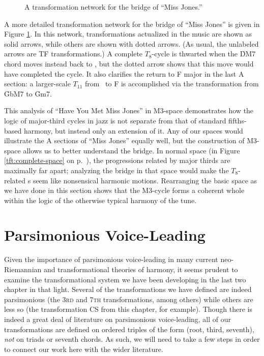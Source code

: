 \begin{figure}[tbp]
  \caption{A transformation network for the bridge of ``Miss Jones.''}
\label{maj3:miss-jones-bridge}
\end{figure}

A more detailed transformation network for the bridge of ``Miss Jones'' is
given in Figure \ref{maj3:miss-jones-bridge}. In this network,
transformations actualized in the music are shown as solid arrows, while
others are shown with dotted arrows. (As usual, the unlabeled arrows are TF
transformations.) A complete $T_8$-cycle is thwarted when the \h{DM7} chord
moves instead back to \Gflat, but the dotted arrow shows that this move would
have completed the cycle. It also clarifies the return to F major in the last
A section: a larger-scale $T_{11}$ from \Gflat\ to F is accomplished via the
\slideS transformation from \h{GbM7} to \h{Gm7}.

This analysis of ``Have You Met Miss Jones'' in M3-space demonstrates how the
logic of major-third cycles in jazz is not separate from that of standard
fifths-based harmony, but instead only an extension of it. Any of our spaces
would illustrate the A sections of ``Miss Jones'' equally well, but the
construction of M3-space allows us to better understand the bridge. In normal
\tf space (in Figure \ref{tft:complete-space} on
p.~\pageref{tft:complete-space}), the \tfo progressions related by major
thirds are maximally far apart; analyzing the bridge in that space would make
the $T_8$-related \tfo{}s seem like nonsensical harmonic motions. Rearranging
the basic space as we have done in this section shows that the M3-cycle forms
a coherent whole within the logic of the otherwise typical harmony of the
tune.

\section{Parsimonious Voice-Leading}
\label{sec:parsimony}

Given the importance of parsimonious voice-leading in many current
neo-Riemannian and transformational theories of harmony, it seems prudent to
examine the transformational system we have been developing in the last two
chapter in that light. Several of the transformations we have defined are
indeed parsimonious (the \textsc{3rd} and \textsc{7th} transformations, among
others) while others are less so (the transformation CS from this chapter, for
example). Though there is indeed a great deal of literature on parsimonious
voice-leading, all of our transformations are defined on ordered
triples of the form (root, third, seventh), \emph{not} on triads or seventh
chords. As such, we will need to take a few steps in order to connect our work
here with the wider literature.

